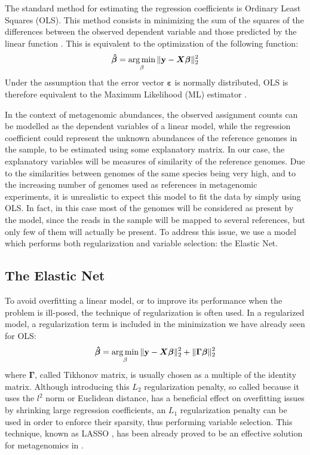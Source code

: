The standard method for estimating the regression coefficients is Ordinary Least Squares (OLS). This method consists in minimizing the sum of the squares of the differences between the observed dependent variable and those predicted by the linear function \cite{noauthor_linear_2018}. This is equivalent to the optimization of the following function:
\begin{equation*}
    \boldsymbol{\hat{\beta}} = \operatorname*{arg\,min}_{\beta}{\lVert\mathbf{y} - \boldsymbol{X}\boldsymbol{\beta}\rVert_2^2}
\end{equation*}
Under the assumption that the error vector $\boldsymbol{\varepsilon}$ is normally distributed, OLS is therefore equivalent to the Maximum Likelihood (ML) estimator \cite{noauthor_linear_2018}.

In the context of metagenomic abundances, the observed assignment counts can be modelled as the dependent variables of a linear model, while the regression coefficient could represent the unknown abundances of the reference genomes in the sample, to be estimated using some explanatory matrix. In our case, the explanatory variables will be measures of similarity of the reference genomes. Due to the similarities between genomes of the same species being very high, and to the increasing number of genomes used as references in metagenomic experiments, it is unrealistic to expect this model to fit the data by simply using OLS. In fact, in this case most of the genomes will be considered as present by the model, since the reads in the sample will be mapped to several references, but only few of them will actually be present. To address this issue, we use a model which performs both regularization and variable selection: the Elastic Net.

\subsection{The Elastic Net}

To avoid overfitting a linear model, or to improve its performance when the problem is ill-posed, the technique of regularization is often used. In a regularized model, a regularization term is included in the minimization we have already seen for OLS:
\begin{equation*}
    \boldsymbol{\hat{\beta}} = \operatorname*{arg\,min}_{\beta}{\lVert\mathbf{y} - \boldsymbol{X}\boldsymbol{\beta}\rVert_2^2} + \lVert\boldsymbol{\Gamma}\boldsymbol{\beta}\rVert_2^2
\end{equation*}
where $\boldsymbol{\Gamma}$, called Tikhonov matrix, is usually chosen as a multiple of the identity matrix. Although introducing this $L_2$ regularization penalty, so called because it uses the $l^2$ norm or Euclidean distance, has a beneficial effect on overfitting issues by shrinking large regression coefficients, an $L_1$ regularization penalty can be used in order to enforce their sparsity, thus performing variable selection. This technique, known as LASSO \cite{tibshirani_regression_1996}, has been already proved to be an effective solution for metagenomics in \cite{lindner_metagenomic_2013}.

